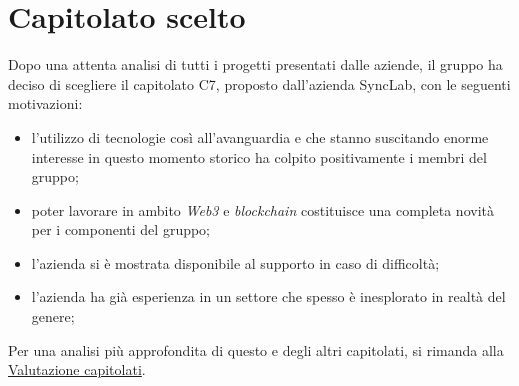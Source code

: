 \section{Capitolato scelto}
Dopo una attenta analisi di tutti i progetti presentati dalle aziende, il gruppo ha deciso di scegliere il capitolato C7, proposto dall'azienda SyncLab, con le seguenti motivazioni:
\begin{itemize}
    \item l'utilizzo di tecnologie così all'avanguardia e che stanno suscitando enorme interesse in questo momento storico ha colpito positivamente i membri del gruppo;
    \item poter lavorare in ambito \textit{Web3} e \textit{blockchain} costituisce una completa novità per i componenti del gruppo;
    \item l'azienda si è mostrata disponibile al supporto in caso di difficoltà;
    \item l'azienda ha già esperienza in un settore che spesso è inesplorato in realtà del genere;
\end{itemize}
Per una analisi più approfondita di questo e degli altri capitolati, si rimanda alla \hyperref[sec:Valutazione capitolati]{Valutazione capitolati}.